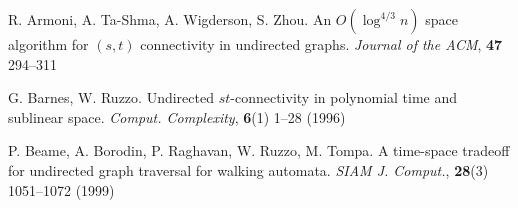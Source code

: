 \documentclass[12pt,letterpaper,oneside]{book}
\begin{document}
\backmatter
\newpage 
{}
\begin{thebibliography}{9}





 R. Armoni, A. Ta-Shma, A. Wigderson, S. Zhou.  An $O(\log^{4/3} n)$ space 
algorithm for $(s,t)$ connectivity in undirected graphs.  \emph{Journal of the ACM}, 
\textbf{47} 294--311




 G. Barnes, W. Ruzzo.  Undirected $st$-connectivity in polynomial time and sublinear space.  
\emph{Comput. Complexity}, \textbf{6}(1) 1--28 (1996)

 P. Beame, A. Borodin, P. Raghavan, W. Ruzzo, M. Tompa.  A time-space tradeoff 
for undirected graph traversal for walking automata.  \emph{SIAM J. Comput.}, \textbf{28}(3) 1051--1072 (1999)





\end{thebibliography}
\end{document}
